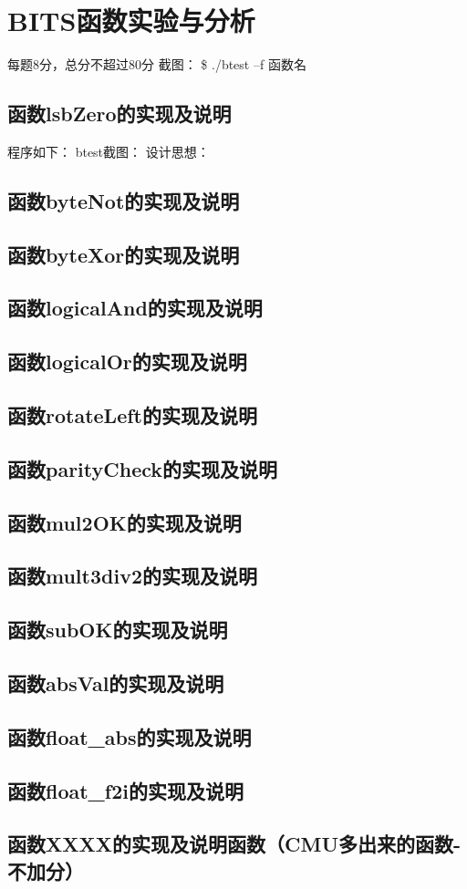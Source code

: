 \section{BITS函数实验与分析}
\begin{center}
    每题8分，总分不超过80分
    截图：  \$ ./btest –f 函数名
\end{center}

\subsection{函数lsbZero的实现及说明}
程序如下：
btest截图：
设计思想：
\subsection{函数byteNot的实现及说明}
\subsection{函数byteXor的实现及说明}
\subsection{函数logicalAnd的实现及说明}
\subsection{函数logicalOr的实现及说明}
\subsection{函数rotateLeft的实现及说明}
\subsection{函数parityCheck的实现及说明}
\subsection{函数mul2OK的实现及说明}
\subsection{函数mult3div2的实现及说明}
\subsection{函数subOK的实现及说明}
\subsection{函数absVal的实现及说明}
\subsection{函数float\_abs的实现及说明}
\subsection{函数float\_f2i的实现及说明}
\subsection{函数XXXX的实现及说明函数（CMU多出来的函数-不加分）}



